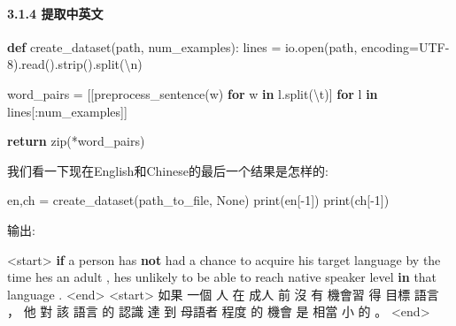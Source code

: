 \documentclass[
]{article}
\newenvironment{Shaded}{}{}
\newcommand{\BuiltInTok}[1]{#1}
\newcommand{\CharTok}[1]{\textcolor[rgb]{0.25,0.44,0.63}{#1}}
\newcommand{\ControlFlowTok}[1]{\textcolor[rgb]{0.00,0.44,0.13}{\textbf{#1}}}
\newcommand{\DecValTok}[1]{\textcolor[rgb]{0.25,0.63,0.44}{#1}}
\newcommand{\KeywordTok}[1]{\textcolor[rgb]{0.00,0.44,0.13}{\textbf{#1}}}
\newcommand{\NormalTok}[1]{#1}
\newcommand{\OperatorTok}[1]{\textcolor[rgb]{0.40,0.40,0.40}{#1}}
\newcommand{\StringTok}[1]{\textcolor[rgb]{0.25,0.44,0.63}{#1}}
\newcommand{\VariableTok}[1]{\textcolor[rgb]{0.10,0.09,0.49}{#1}}
\begin{document}
\hypertarget{header-n98}{%
\paragraph{3.1.4 提取中英文}\label{header-n98}}

\begin{Shaded}
\begin{Highlighting}[]
\KeywordTok{def}\NormalTok{ create\_dataset(path, num\_examples):}
\NormalTok{    lines }\OperatorTok{=}\NormalTok{ io.}\BuiltInTok{open}\NormalTok{(path, encoding}\OperatorTok{=}\StringTok{\textquotesingle{}UTF{-}8\textquotesingle{}}\NormalTok{).read().strip().split(}\StringTok{\textquotesingle{}}\CharTok{\textbackslash{}n}\StringTok{\textquotesingle{}}\NormalTok{)}

\NormalTok{    word\_pairs }\OperatorTok{=}\NormalTok{ [[preprocess\_sentence(w) }\ControlFlowTok{for}\NormalTok{ w }\KeywordTok{in}\NormalTok{ l.split(}\StringTok{\textquotesingle{}}\CharTok{\textbackslash{}t}\StringTok{\textquotesingle{}}\NormalTok{)]  }\ControlFlowTok{for}\NormalTok{ l }\KeywordTok{in}\NormalTok{ lines[:num\_examples]]}

    \ControlFlowTok{return} \BuiltInTok{zip}\NormalTok{(}\OperatorTok{*}\NormalTok{word\_pairs)}
\end{Highlighting}
\end{Shaded}

我们看一下现在English和Chinese的最后一个结果是怎样的:

\begin{Shaded}
\begin{Highlighting}[]
\NormalTok{en,ch }\OperatorTok{=}\NormalTok{ create\_dataset(path\_to\_file, }\VariableTok{None}\NormalTok{)}
\BuiltInTok{print}\NormalTok{(en[}\OperatorTok{{-}}\DecValTok{1}\NormalTok{])}
\BuiltInTok{print}\NormalTok{(ch[}\OperatorTok{{-}}\DecValTok{1}\NormalTok{])}
\end{Highlighting}
\end{Shaded}

输出:

\begin{Shaded}
\begin{Highlighting}[]
\OperatorTok{\textless{}}\NormalTok{start}\OperatorTok{\textgreater{}} \ControlFlowTok{if}\NormalTok{ a person has }\KeywordTok{not}\NormalTok{ had a chance to acquire his target language by the time he}\StringTok{\textquotesingle{}s an adult , he\textquotesingle{}}\NormalTok{s unlikely to be able to reach native speaker level }\KeywordTok{in}\NormalTok{ that language . }\OperatorTok{\textless{}}\NormalTok{end}\OperatorTok{\textgreater{}}
\OperatorTok{\textless{}}\NormalTok{start}\OperatorTok{\textgreater{}}\NormalTok{ 如果 一個 人 在 成人 前 沒 有 機會習 得 目標 語言 ， 他 對 該 語言 的 認識 達 到 母語者 程度 的 機會 是 相當 小 的 。 }\OperatorTok{\textless{}}\NormalTok{end}\OperatorTok{\textgreater{}}
\end{Highlighting}
\end{Shaded}
\end{document}
